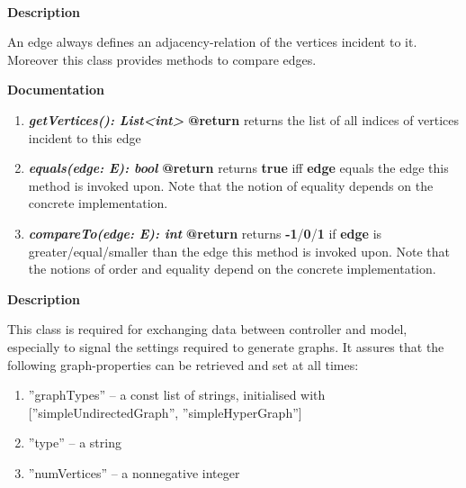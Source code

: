 	~\newline
	~\newline
	~\newline
	
	\textbf{Description}
	
	An edge always defines an adjacency-relation of the vertices incident to it. Moreover this class provides methods to compare edges.
	
	\textbf{Documentation}
	\begin{enumerate}[+]
		\item{
			\textbf{\textit{getVertices(): List<int>}} \newline
			\textbf{@return} returns the list of all indices of vertices incident to this edge
		}
		\item{
			\textbf{\textit{equals(edge: E): bool}} \newline
			\textbf{@return} returns \textbf{true} iff \textbf{edge} equals the edge this method is invoked upon. Note that the notion of equality depends on the concrete implementation.
		}
		\item{
			\textbf{\textit{compareTo(edge: E): int}} \newline
			\textbf{@return} returns \textbf{-1}/\textbf{0}/\textbf{1} if \textbf{edge} is greater/equal/smaller than the edge this method is invoked upon. Note that the notions of order and equality depend on the concrete implementation.
		}
	\end{enumerate}
	
	\newpage
	
	
	\textbf{Description}
	
	This class is required for exchanging data between controller and model, especially to signal the settings required to generate graphs. It assures that the following graph-properties can be retrieved and set at all times:
	
	\begin{enumerate}[--]
		\item{''graphTypes'' -- a const list of strings, initialised with [''simpleUndirectedGraph'', ''simpleHyperGraph'']}
		\item{''type'' -- a string}
		\item{''numVertices'' -- a nonnegative integer}
	\end{enumerate}
	
	~\newline
	~\newline
	~\newline
	
